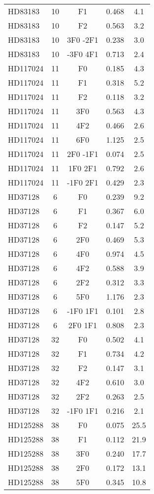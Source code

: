 \begin{table*}
\begin{tabular}{l c c c c}
HD83183 & 10 & F1 & 0.468 & 4.1\\ 
HD83183 & 10 & F2 & 0.563 & 3.2\\ 
HD83183 & 10 & 3F0 -2F1 & 0.238 & 3.0\\ 
HD83183 & 10 & -3F0 4F1 & 0.713 & 2.4\\ 
\hline
HD117024 & 11 & F0 & 0.185 & 4.3\\ 
HD117024 & 11 & F1 & 0.318 & 5.2\\ 
HD117024 & 11 & F2 & 0.118 & 3.2\\ 
HD117024 & 11 & 3F0 & 0.563 & 4.3\\ 
HD117024 & 11 & 4F2 & 0.466 & 2.6\\ 
HD117024 & 11 & 6F0 & 1.125 & 2.5\\ 
HD117024 & 11 & 2F0 -1F1 & 0.074 & 2.5\\ 
HD117024 & 11 & 1F0 2F1 & 0.792 & 2.6\\ 
HD117024 & 11 & -1F0 2F1 & 0.429 & 2.3\\ 
\hline
HD37128 & 6 & F0 & 0.239 & 9.2\\ 
HD37128 & 6 & F1 & 0.367 & 6.0\\ 
HD37128 & 6 & F2 & 0.147 & 5.2\\ 
HD37128 & 6 & 2F0 & 0.469 & 5.3\\ 
HD37128 & 6 & 4F0 & 0.974 & 4.5\\ 
HD37128 & 6 & 4F2 & 0.588 & 3.9\\ 
HD37128 & 6 & 2F2 & 0.312 & 3.3\\ 
HD37128 & 6 & 5F0 & 1.176 & 2.3\\ 
HD37128 & 6 & -1F0 1F1 & 0.101 & 2.8\\ 
HD37128 & 6 & 2F0 1F1 & 0.808 & 2.3\\ 
\hline
HD37128 & 32 & F0 & 0.502 & 4.1\\ 
HD37128 & 32 & F1 & 0.734 & 4.2\\ 
HD37128 & 32 & F2 & 0.147 & 3.1\\ 
HD37128 & 32 & 4F2 & 0.610 & 3.0\\ 
HD37128 & 32 & 2F2 & 0.263 & 2.5\\ 
HD37128 & 32 & -1F0 1F1 & 0.216 & 2.1\\ 
\hline
HD125288 & 38 & F0 & 0.075 & 25.5\\ 
HD125288 & 38 & F1 & 0.112 & 21.9\\ 
HD125288 & 38 & 3F0 & 0.240 & 17.7\\ 
HD125288 & 38 & 2F0 & 0.172 & 13.1\\ 
HD125288 & 38 & 5F0 & 0.345 & 10.8\\ 

\end{tabular}
\end{table*}
